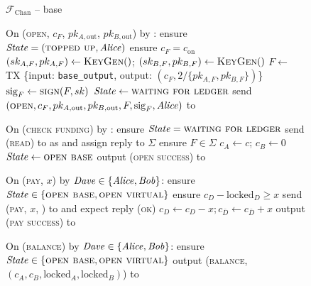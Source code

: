\begin{figure}[H]
  \begin{systembox}{$\mathcal{F}_{\mathrm{Chan}}$ -- base}
    \begin{algorithmic}[1]
      \State On (\textsc{open}, $c_F$, $pk_{A, \mathrm{out}}$, $pk_{B,
      \mathrm{out}}$) by \alice:
      \Indent
        \State ensure $\mathit{State} = (\textsc{topped up}, \mathit{Alice})$
        \State ensure $c_F = c_{\mathrm{on}}$
        \State $(sk_{A, F}, pk_{A, F}) \gets \textsc{KeyGen}()$; $(sk_{B, F},
        pk_{B, F}) \gets \textsc{KeyGen}()$
        \State $F \gets$ TX \{input: \texttt{base\_output}, output: $(c_F,
        2/\{pk_{A, F}, pk_{B, F}\})$\}
        \State $\mathrm{sig}_F \gets \textsc{sign}(F, sk)$
        \State $\mathit{State} \gets \textsc{waiting for ledger}$
        \State send $(\textsc{open}, c_F, pk_{A, \mathrm{out}}, pk_{B,
        \mathrm{out}}, F, \mathrm{sig}_F, \mathit{Alice})$ to \adversary
      \EndIndent
      \Statex

      \State On (\textsc{check funding}) by \alice:
      \Indent
        \State ensure $\mathit{State} = \textsc{waiting for ledger}$
        \State send (\textsc{read}) to \ledger as \alice and assign reply to
        $\Sigma$
        \State ensure $F \in \Sigma$
        \State $c_A \gets c$; $c_B \gets 0$
        \State $\mathit{State} \gets \textsc{open base}$
        \State output (\textsc{open success}) to \alice
      \EndIndent
      \Statex

      \State On (\textsc{pay}, $x$) by $\mathit{Dave} \in \{\mathit{Alice}, \mathit{Bob}\}$:
      \Indent
        \State ensure $\mathit{State} \in \{\textsc{open base}, \textsc{open
        virtual}\}$
        \State ensure $c_D - \mathrm{locked}_D \geq x$
        \State send (\textsc{pay}, $x$, \dave) to \adversary and expect reply
        (\textsc{ok})
        \State $c_D \gets c_D - x; c_{\bar{D}} \gets c_{\bar{D}} + x$
        \State output (\textsc{pay success}) to \dave
      \EndIndent
      \Statex

      \State On (\textsc{balance}) by $\mathit{Dave} \in \{\mathit{Alice}, \mathit{Bob}\}$:
      \Indent
        \State ensure $\mathit{State} \in \{\textsc{open base}, \textsc{open
        virtual}\}$
        \State output (\textsc{balance}, $(c_A, c_B, \mathrm{locked}_A,
        \mathrm{locked}_B)$) to \dave %
      \EndIndent
    \end{algorithmic}
  \end{systembox}
  \caption{}
  \label{code:functionality:chan:skeleton:base}
\end{figure}

